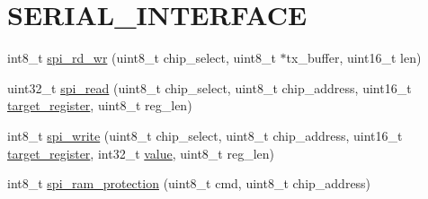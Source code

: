 \hypertarget{a00006}{\section{S\-E\-R\-I\-A\-L\-\_\-\-I\-N\-T\-E\-R\-F\-A\-C\-E}
\label{de/d21/a00006}
}








  


\begin{DoxyCompactItemize}
\item 
int8\-\_\-t \hyperlink{a00006_gadd297682b87478aed2d07f4f536353c1}{spi\-\_\-rd\-\_\-wr} (uint8\-\_\-t chip\-\_\-select, uint8\-\_\-t $\ast$tx\-\_\-buffer, uint16\-\_\-t len)
\begin{DoxyCompactList}\small\item\em 

 \end{DoxyCompactList}\end{DoxyCompactItemize}
\begin{DoxyCompactItemize}
\item 
uint32\-\_\-t \hyperlink{a00006_ga7ad9f65ee46aca507374096506a0b1c4}{spi\-\_\-read} (uint8\-\_\-t chip\-\_\-select, uint8\-\_\-t chip\-\_\-address, uint16\-\_\-t \hyperlink{a00040_ac02048009fa6718e40f028b6bae63f3d}{target\-\_\-register}, uint8\-\_\-t reg\-\_\-len)
\begin{DoxyCompactList}\small\item\em 

 \end{DoxyCompactList}\end{DoxyCompactItemize}
\begin{DoxyCompactItemize}
\item 
int8\-\_\-t \hyperlink{a00006_ga2770219ad8ad1eda1817c0df934b47d0}{spi\-\_\-write} (uint8\-\_\-t chip\-\_\-select, uint8\-\_\-t chip\-\_\-address, uint16\-\_\-t \hyperlink{a00040_ac02048009fa6718e40f028b6bae63f3d}{target\-\_\-register}, int32\-\_\-t \hyperlink{a00040_a638e4503e0ae6ce655b7ad2e17e8f0ad}{value}, uint8\-\_\-t reg\-\_\-len)
\end{DoxyCompactItemize}
\begin{DoxyCompactItemize}
\item 
int8\-\_\-t \hyperlink{a00006_gae51aa618efe7af5f3a68ac324f2a7840}{spi\-\_\-ram\-\_\-protection} (uint8\-\_\-t cmd, uint8\-\_\-t chip\-\_\-address)
\begin{DoxyCompactList}\small\item\em 

 \end{DoxyCompactList}\end{DoxyCompactItemize}


